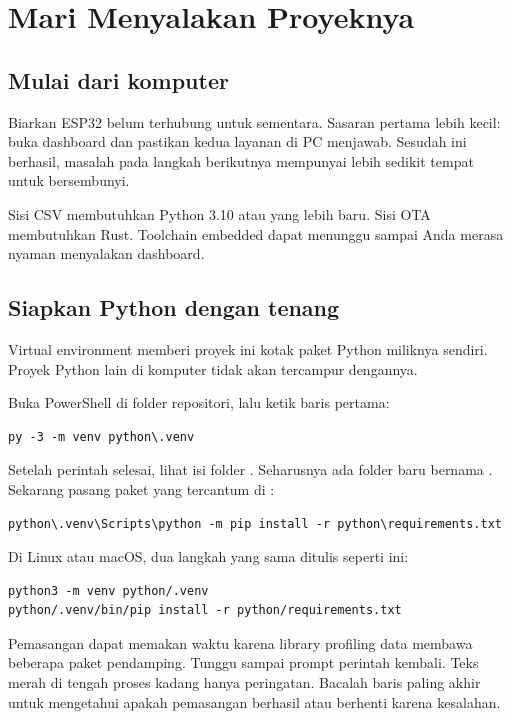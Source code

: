 \chapter{Mari Menyalakan Proyeknya}

\section{Mulai dari komputer}

Biarkan ESP32 belum terhubung untuk sementara. Sasaran pertama lebih kecil: buka dashboard dan pastikan kedua layanan di PC menjawab. Sesudah ini berhasil, masalah pada langkah berikutnya mempunyai lebih sedikit tempat untuk bersembunyi.

Sisi CSV membutuhkan Python 3.10 atau yang lebih baru. Sisi OTA membutuhkan Rust. Toolchain embedded dapat menunggu sampai Anda merasa nyaman menyalakan dashboard.

\section{Siapkan Python dengan tenang}

Virtual environment memberi proyek ini kotak paket Python miliknya sendiri. Proyek Python lain di komputer tidak akan tercampur dengannya.

Buka PowerShell di folder repositori, lalu ketik baris pertama:

\begin{lstlisting}
py -3 -m venv python\.venv
\end{lstlisting}

Setelah perintah selesai, lihat isi folder . Seharusnya ada folder baru bernama . Sekarang pasang paket yang tercantum di :

\begin{lstlisting}
python\.venv\Scripts\python -m pip install -r python\requirements.txt
\end{lstlisting}

Di Linux atau macOS, dua langkah yang sama ditulis seperti ini:

\begin{lstlisting}
python3 -m venv python/.venv
python/.venv/bin/pip install -r python/requirements.txt
\end{lstlisting}

Pemasangan dapat memakan waktu karena library profiling data membawa beberapa paket pendamping. Tunggu sampai prompt perintah kembali. Teks merah di tengah proses kadang hanya peringatan. Bacalah baris paling akhir untuk mengetahui apakah pemasangan berhasil atau berhenti karena kesalahan.

